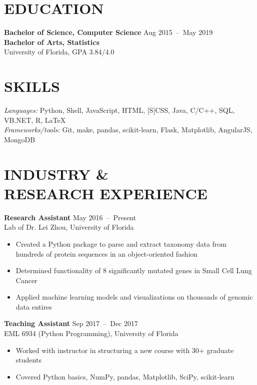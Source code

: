 \documentclass[line,resmargin]{res}
\begin{document}
\address{\href{mailto:victor@victorl.in}{victor@victorl.in} $|$
         \href{https://victorl.in/}{https://victorl.in/}}

\begin{resume}

\section{EDUCATION}
    \textbf{Bachelor of Science, Computer Science}    \hfill Aug 2015~--~May 2019 \\
    \textbf{Bachelor of Arts, Statistics} \\
    University of Florida, GPA 3.84/4.0

\section{SKILLS}
    {\sl Languages:} Python, Shell, JavaScript, HTML, [S]CSS, Java, C/C++, SQL, VB.NET, R, LaTeX \\
    {\sl Frameworks/tools:} Git, make, pandas, scikit-learn, Flask, Matplotlib, AngularJS, MongoDB

\section{INDUSTRY \& \\ RESEARCH EXPERIENCE}
    \textbf{Research Assistant}    \hfill May 2016~--~Present \\
    Lab of Dr. Lei Zhou, University of Florida
    \begin{itemize}  \itemsep -2pt
        \item Created a Python package to parse and extract taxonomy data from hundreds of protein sequences in an object-oriented fashion
        \item Determined functionality of 8 significantly mutated genes in Small Cell Lung Cancer
        \item Applied machine learning models and visualizations on thousands of genomic data entires
    \end{itemize}

    \textbf{Teaching Assistant}    \hfill Sep 2017~--~Dec 2017 \\
    EML 6934 (Python Programming), University of Florida
    \begin{itemize}  \itemsep -2pt
        \item Worked with instructor in structuring a new course with 30+ graduate students
        \item Covered Python basics, NumPy, pandas, Matplotlib, SciPy, scikit-learn
    \end{itemize}


\end{resume}
\end{document}
